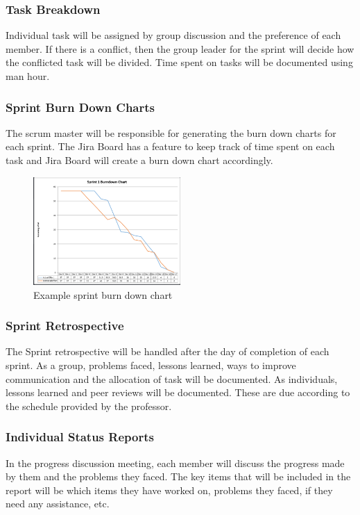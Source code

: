 \subsubsection{Task Breakdown}
Individual task will be assigned by group discussion and the preference of each member. If there is a conflict, then the group leader for the sprint will decide how the conflicted task will be divided. Time spent on tasks will be documented using man hour.

\subsubsection{Sprint Burn Down Charts}
The scrum master will be responsible for generating the burn down charts for each sprint. The Jira Board has a feature to keep track of time spent on each task and Jira Board will create a burn down chart accordingly.

\begin{figure}[h!]
    \centering
    \includegraphics[width=0.5\textwidth]{images/burndown}
    \caption{Example sprint burn down chart}
\end{figure}

\subsubsection{Sprint Retrospective}
The Sprint retrospective will be handled after the day of completion of each sprint. As a group, problems faced, lessons learned, ways to improve communication and the allocation of task will be documented. As individuals, lessons learned and peer reviews will be documented. These are due according to the schedule provided by the professor.

\subsubsection{Individual Status Reports}
In the progress discussion meeting, each member will discuss the progress made by them and the problems they faced. The key items that will be included in the report will be which items they have worked on, problems they faced, if they need any assistance, etc.

